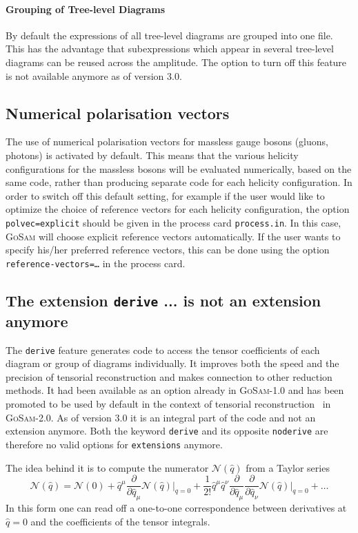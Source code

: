 \documentclass[11pt,a4paper]{refrep}
\newcommand{\gosam}{\textsc{GoSam}\xspace}
\begin{document}
\paragraph{Grouping of Tree-level Diagrams}

By default the expressions of all tree-level diagrams are grouped into one
file. This has the advantage that subexpressions which appear in several
tree-level diagrams can be reused across the amplitude. The option to turn off this feature is not available anymore as of version 3.0.

\subsection{Numerical polarisation vectors}
\label{sec:numpolvec}
The use of numerical polarisation vectors for massless gauge bosons
(gluons, photons) is activated by default.  This means that the
various helicity configurations for the massless bosons will be
evaluated numerically, based on the same code, rather than producing
separate code for each helicity configuration.  In order to switch off
this default setting,
for example if the user would like to 
optimize the choice of reference vectors for each helicity configuration,
the option {\tt polvec=explicit} should be given in the process card 
{\tt process.in}.
In this case, \gosam{} will choose explicit reference vectors automatically.
If the user wants to specify his/her preferred reference vectors, 
this can be done using the option {\tt reference-vectors=\ldots}
in the process card.

\subsection{The extension {\tt derive} ... is not an extension anymore}
\label{sec:derive}
The {\tt derive} feature generates code to access the tensor coefficients
of each diagram or group of diagrams individually. It improves both the speed and the precision of tensorial reconstruction and makes connection to other reduction methods. It had been available as an option already in \gosam-1.0 and has been promoted to be used by default in the context of  tensorial reconstruction~\cite{Heinrich:2010ax} in \gosam-2.0. As of version 3.0 it is an integral part of the code and not an extension anymore. Both the keyword \texttt{derive} and its opposite \texttt{noderive} are therefore no valid options for \texttt{extensions} anymore.

The idea behind it is to compute the numerator $\mathcal{N}(\hat{q})$ 
from a Taylor series
\begin{equation}
\mathcal{N}(\hat{q})=\mathcal{N}(0)
+ \hat{q}^\mu
  \frac{\partial}{\partial\hat{q}_\mu}\mathcal{N}(\hat{q})\vert_{q=0}
+ \frac1{2!}\hat{q}^\mu\hat{q}^\nu
  \frac{\partial}{\partial\hat{q}_\mu}
  \frac{\partial}{\partial\hat{q}_\nu}
  \mathcal{N}(\hat{q})\vert_{q=0} + \ldots
\end{equation}
In this form one can read off a one-to-one correspondence between derivatives at
$\hat{q}=0$ and the coefficients of the tensor integrals.
\end{document}
